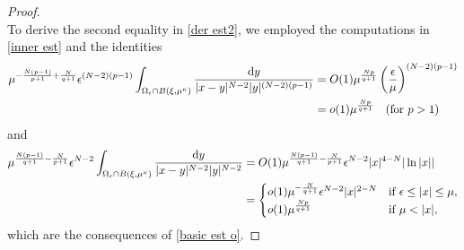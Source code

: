 \documentclass[reqno]{amsart}
\theoremstyle{remark}
\newcommand{\ep}{\epsilon}
\newcommand{\dy}{\textup{d}y}
\renewcommand{\(}{\left(}
\renewcommand{\)}{\right)}
\numberwithin{equation}{section}
\begin{document}
\begin{proof}
\begin{equation}
\end{equation}
To derive the second equality in \eqref{der est2}, we employed the computations in \eqref{inner est} and the identities
\begin{align*}
\mu^{-\frac{N(p-1)}{p+1}+\frac{N}{q+1}}\ep^{(N-2)(p-1)}\int_{\Omega_\ep \cap B(\xi,\mu^\kappa)}\frac{\dy}{|x-y|^{N-2}|y|^{(N-2)(p-1)}} &= O(1)\mu^{\frac{Np}{q+1}}\(\frac{\ep}{\mu}\)^{(N-2)(p-1)} \\
&= o(1)\mu^{\frac{Np}{q+1}} \quad (\textup{for } p > 1)
\end{align*}
and
\begin{align*}
\mu^{\frac{N(p-1)}{q+1}-\frac{N}{p+1}}\ep^{N-2} \int_{\Omega_\ep \cap B(\xi,\mu^\kappa)} \frac{\dy}{|x-y|^{N-2}|y|^{N-2}}
&=O(1)\mu^{\frac{N(p-1)}{q+1}-\frac{N}{p+1}}\ep^{N-2}|x|^{4-N} |\ln|x|| \\
&=\begin{cases} o(1)\mu^{-\frac{N}{q+1}}\ep^{N-2} |x|^{2-N} &\textup{if } \ep \le|x| \le \mu,\\
o(1)\mu^{\frac{Np}{q+1}} &\textup{if } \mu<|x|,
\end{cases}
\end{align*}
which are the consequences of \eqref{basic est o}.


\end{proof}
\end{document}
